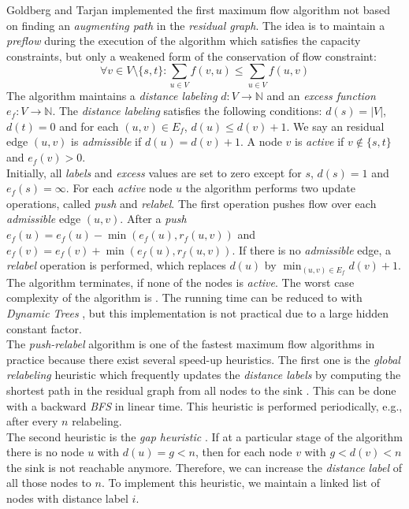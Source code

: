 Goldberg and Tarjan \cite{goldberg1988new} implemented the first maximum flow algorithm
not based on finding an \emph{augmenting path} in the \emph{residual graph}. The idea is
to maintain a \emph{preflow} during the execution of the algorithm which satisfies the capacity 
constraints, but only a weakened form of the conservation of flow constraint:
\[\forall v \in V \setminus \{s,t\}: \sum_{u \in V} f(v,u) \le \sum_{u \in V} f(u,v)\]
The algorithm maintains a \emph{distance labeling} $d: V \rightarrow \mathbb{N}$ and an 
\emph{excess function} $e_f: V \rightarrow \mathbb{N}$. The \emph{distance labeling} satisfies
the following conditions: $d(s) = |V|$, $d(t) = 0$ and for each $(u,v) \in E_f$, $d(u) \le d(v) + 1$. We say an
residual edge $(u,v)$ is \emph{admissible} if $d(u) = d(v) + 1$. A node $v$ is \emph{active}
if $v \notin \{s,t\}$ and $e_f(v) > 0$.\\
Initially, all \emph{labels} and \emph{excess} values are set to zero except for $s$, $d(s) = 1$
and $e_f(s) = \infty$. For each \emph{active} node $u$ the algorithm performs two update
operations, called \emph{push} and \emph{relabel}. The first operation pushes flow
over each \emph{admissible} edge $(u,v)$. After a \emph{push} $e_f(u) = e_f(u) - 
\min{(e_f(u),r_f(u,v))}$ and $e_f(v) = e_f(v) + \min{(e_f(u),r_f(u,v))}$. If there is no
\emph{admissible} edge, a \emph{relabel} operation is performed, which replaces $d(u)$ by
$\min_{(u,v) \in E_f} d(v) + 1$. The algorithm terminates, if none of the nodes is \emph{active}.
The worst case complexity of the algorithm is . The running time can be reduced
to  with \emph{Dynamic Trees} \cite{goldberg1988new, sleator1981data}, but this
implementation is not practical due to a large hidden constant factor.\\
The \emph{push-relabel} algorithm is one of the fastest maximum flow algorithms in practice
because there exist several speed-up heuristics. The first one is
the \emph{global relabeling} heuristic which frequently updates the \emph{distance labels} by computing
the shortest path in the residual graph from all nodes to the sink \cite{cherkassky1997implementing}.
This can be done with a backward \emph{BFS} in linear time. This heuristic is performed periodically,
e.g., after every $n$ relabeling. \\
The second heuristic is the \emph{gap heuristic} \cite{cherkassky1994fast,derigs1989implementing}.
If at a particular stage of the algorithm there is no node $u$ with $d(u) = g < n$, then for each node
$v$ with $g < d(v) < n$ the sink is not reachable anymore. Therefore, we can increase the \emph{distance
label} of all those nodes to $n$. To implement this heuristic, we maintain a linked list of
nodes with distance label $i$.

